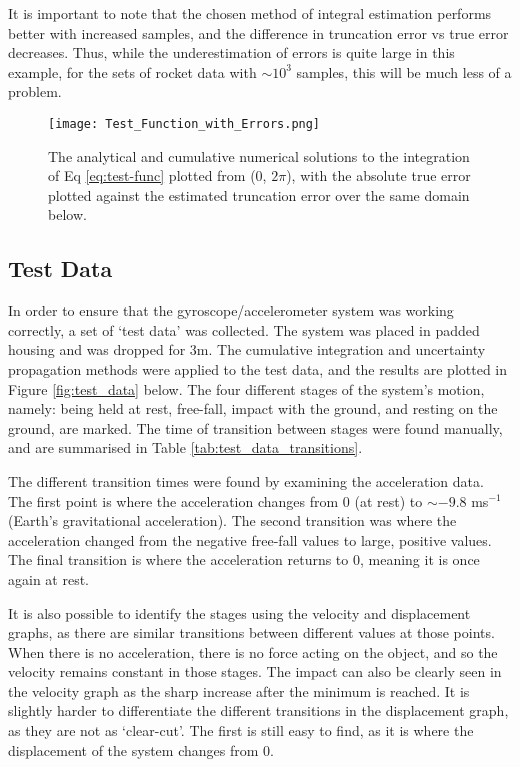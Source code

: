 \documentclass{article}
\begin{document}
        It is important to note that the chosen method of integral estimation performs better with increased samples, and the difference in truncation error vs true error decreases. Thus, while the underestimation of errors is quite large in this example, for the sets of rocket data with $\sim 10^3$ samples, this will be much less of a problem.

        \begin{figure}[H]
            \centering
            \texttt{[image: Test\_Function\_with\_Errors.png]}
            \caption{The analytical and cumulative numerical solutions to the integration of Eq \ref{eq:test-func} plotted from (0, $2 \pi$), with the absolute true error plotted against the estimated truncation error over the same domain below.}
            \label{fig:test-func-plot}
        \end{figure}

    \subsection*{Test Data}

        In order to ensure that the gyroscope/accelerometer system was working correctly, a set of `test data' was collected. The system was placed in padded housing and was dropped for 3m. The cumulative integration and uncertainty propagation methods were applied to the test data, and the results are plotted in Figure \ref{fig:test_data} below. The four different stages of the system's motion, namely: being held at rest, free-fall, impact with the ground, and resting on the ground, are marked. The time of transition between stages were found manually, and are summarised in Table \ref{tab:test_data_transitions}. 

        The different transition times were found by examining the acceleration data. The first point is where the acceleration changes from 0 (at rest) to $\sim -9.8$ ms$^{-1}$ (Earth's gravitational acceleration). The second transition was where the acceleration changed from the negative free-fall values to large, positive values. The final transition is where the acceleration returns to 0, meaning it is once again at rest. 
        
        It is also possible to identify the stages using the velocity and displacement graphs, as there are similar transitions between different values at those points. When there is no acceleration, there is no force acting on the object, and so the velocity remains constant in those stages. The impact can also be clearly seen in the velocity graph as the sharp increase after the minimum is reached. It is slightly harder to differentiate the different transitions in the displacement graph, as they are not as `clear-cut'. The first is still easy to find, as it is where the displacement of the system changes from 0. 
        
\end{document}
